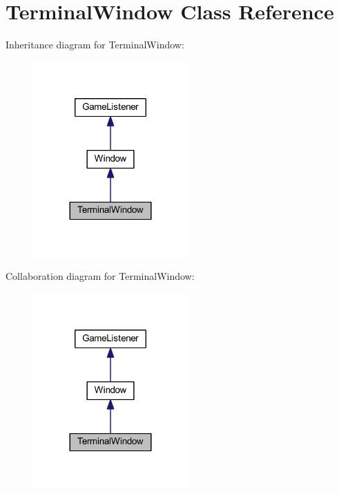 \hypertarget{class_terminal_window}{}\section{Terminal\+Window Class Reference}
\label{class_terminal_window}


Inheritance diagram for Terminal\+Window\+:\nopagebreak
\begin{figure}[H]
\begin{center}
\leavevmode
\includegraphics[width=168pt]{class_terminal_window__inherit__graph}
\end{center}
\end{figure}


Collaboration diagram for Terminal\+Window\+:\nopagebreak
\begin{figure}[H]
\begin{center}
\leavevmode
\includegraphics[width=168pt]{class_terminal_window__coll__graph}
\end{center}
\end{figure}
